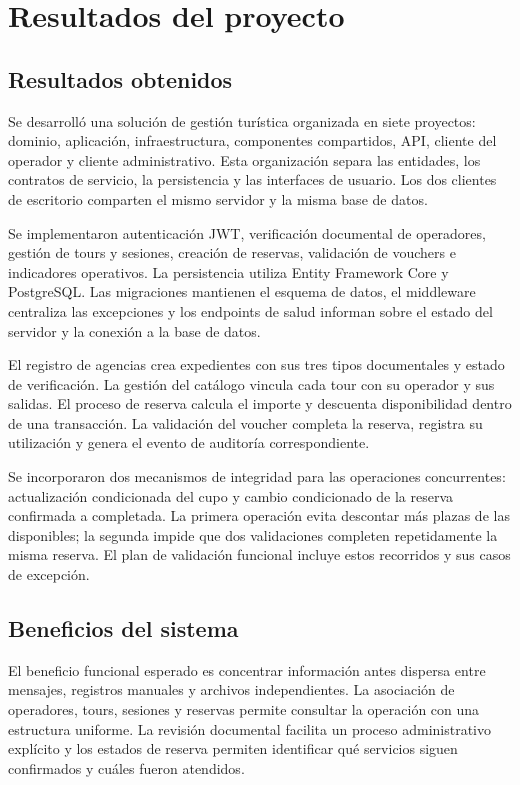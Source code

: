 \chapter{Resultados del proyecto}
\label{cap:resultados}
\section{Resultados obtenidos}
Se desarrolló una solución de gestión turística organizada en siete proyectos: dominio, aplicación, infraestructura, componentes compartidos, API, cliente del operador y cliente administrativo. Esta organización separa las entidades, los contratos de servicio, la persistencia y las interfaces de usuario. Los dos clientes de escritorio comparten el mismo servidor y la misma base de datos.

Se implementaron autenticación JWT, verificación documental de operadores, gestión de tours y sesiones, creación de reservas, validación de vouchers e indicadores operativos. La persistencia utiliza Entity Framework Core y PostgreSQL. Las migraciones mantienen el esquema de datos, el middleware centraliza las excepciones y los endpoints de salud informan sobre el estado del servidor y la conexión a la base de datos.

El registro de agencias crea expedientes con sus tres tipos documentales y estado de verificación. La gestión del catálogo vincula cada tour con su operador y sus salidas. El proceso de reserva calcula el importe y descuenta disponibilidad dentro de una transacción. La validación del voucher completa la reserva, registra su utilización y genera el evento de auditoría correspondiente.

Se incorporaron dos mecanismos de integridad para las operaciones concurrentes: actualización condicionada del cupo y cambio condicionado de la reserva confirmada a completada. La primera operación evita descontar más plazas de las disponibles; la segunda impide que dos validaciones completen repetidamente la misma reserva. El plan de validación funcional incluye estos recorridos y sus casos de excepción.

\section{Beneficios del sistema}
El beneficio funcional esperado es concentrar información antes dispersa entre mensajes, registros manuales y archivos independientes. La asociación de operadores, tours, sesiones y reservas permite consultar la operación con una estructura uniforme. La revisión documental facilita un proceso administrativo explícito y los estados de reserva permiten identificar qué servicios siguen confirmados y cuáles fueron atendidos.

